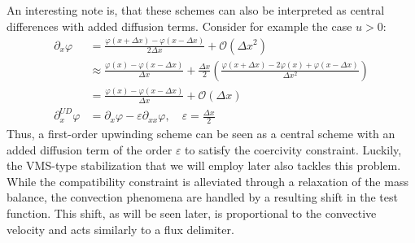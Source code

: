An interesting note is, that these schemes can also be interpreted as central differences with added diffusion terms. Consider for example the case $u>0$:
\begin{equation*}
	\begin{split}
		\partial_x\varphi &= \frac{\varphi(x+\Delta x) - \varphi(x-\Delta x)}{2\Delta x} + \mathcal{O}(\Delta x^2)\\ &\approx \frac{\varphi(x) - \varphi(x-\Delta x)}{\Delta x} + \frac{\Delta x}{2}\left(\frac{\varphi(x+\Delta x) - 2\varphi(x) + \varphi(x - \Delta x)}{\Delta x^2}\right)\\
		&= \frac{\varphi(x) - \varphi(x-\Delta x)}{\Delta x}  + \mathcal{O}(\Delta x)\\
		\partial_{x}^{UD}\varphi &= \partial_{x}\varphi - \varepsilon\partial_{xx}\varphi, \quad \varepsilon = \frac{\Delta x}{2}
	\end{split}
\end{equation*}
Thus, a first-order upwinding scheme can be seen as a central scheme with an added diffusion term of the order $\varepsilon$ to satisfy the coercivity constraint. Luckily, the VMS-type stabilization that we will employ later also tackles this problem. While the compatibility constraint is alleviated through a relaxation of the mass balance, the convection phenomena are handled by a resulting shift in the test function. This shift, as will be seen later, is proportional to the convective velocity and acts similarly to a flux delimiter.

